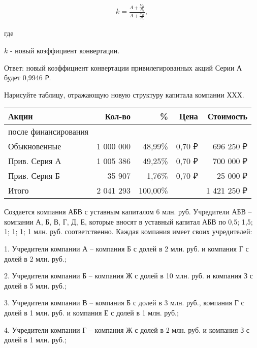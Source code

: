 \documentclass[12pt, table]{exam}
\begin{document}
\begin{questions}
\begin{subparts}
\begin{solution}[9em]
\begin{align}
k=\frac{A+\frac{V_B}{P_0}}{A+\frac{V_B}{P_1}},
\end{align}

где

$k$ - новый коэффициент конвертации.

Ответ: новый коэффициент конвертации привилегированных акций Серии А будет 0,9946 ₽.
\end{solution}

\subpart[5] Нарисуйте таблицу, отражающую новую структуру капитала компании ХХХ.
\begin{solution}[12em]
	\begin{tabular}{lrrrr}
		\toprule
		Акции & Кол-во & \%    & Цена  & Стоимость \\
		\midrule
		после финансирования &       &       &       &  \\
		Обыкновенные &                 1 000 000    & 48,99\% &               0,70 ₽  &            696 250 ₽  \\
		Прив. Серия А &                 1 005 386    & 49,25\% &               0,70 ₽  &            700 000 ₽  \\
		Прив. Серия Б &                       35 907    & 1,76\% &               0,70 ₽  &              25 000 ₽  \\
		Итого &                 2 041 293    & 100,00\% &       &         1 421 250 ₽  \\
		\bottomrule
	\end{tabular}%
\end{solution}
\end{subparts}
\addpoints

\pagebreak
\question[20]
Создается компания АБВ с уставным капиталом 6 млн. руб. Учредители АБВ – компании А, Б, В, Г, Д, Е, которые вносят в уставный капитал АБВ по 0,5; 1,5; 1; 1; 1; 1 млн. руб. соответственно. Каждая компания имеет своих учредителей:

1.	Учредители компании А – компания Б с долей в 2 млн. руб. и компания Г с долей в 2 млн. руб.;

2.	Учредители компании Б – компания Ж с долей в 10 млн. руб. и компания З с долей в 5 млн. руб.;

3.	Учредители компании В – компания Б с долей в 3 млн. руб., компания Г с долей в 1 млн. руб. и компания Е с долей в 1 млн. руб.;

4.	Учредители компании Г – компания Ж с долей в 2 млн. руб. и компания З с долей в 1 млн. руб.;


\end{questions}
\end{document}
